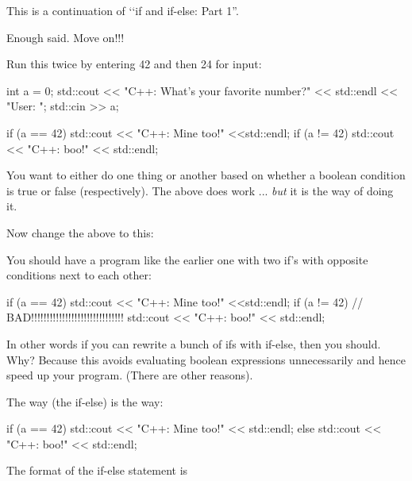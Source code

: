 \newpage{}

This is a continuation of \lq\lq if and if-else: Part 1''.

Enough said. Move on!!!

\newpage{}

Run this twice by entering 42 and then 24 for input:
\begin{console}
int a = 0;
std::cout << "C++: What's your favorite number?"
          << std::endl << "User: ";
std::cin >> a;

if (a == 42)
   std::cout << "C++: Mine too!" <<std::endl;
if (a != 42)
   std::cout << "C++: boo!" << std::endl;
\end{console}

You want to either do one thing or another based on whether a boolean
condition is true or false (respectively). The above does work ...
\textit{but} it is the  way of doing it.

Now change the above to this:

You should  have a program like the earlier one with two
if's with opposite conditions next to each other:
\begin{console}
if (a == 42)
   std::cout << "C++: Mine too!" <<std::endl;
if (a != 42)      // BAD!!!!!!!!!!!!!!!!!!!!!!!!!!!!!!
   std::cout << "C++: boo!" << std::endl;
\end{console}

In other words if you can rewrite a bunch of ifs with if-else, then you
should. Why? Because this avoids evaluating boolean expressions
unnecessarily and hence speed up your program. (There are other
reasons).

The  way (the if-else) is the  way:

\begin{console}
if (a == 42)
   std::cout << "C++: Mine too!" << std::endl;
else
   std::cout << "C++: boo!" << std::endl;
\end{console}

The format of the if-else statement is
\begin{center}
\\
\EMPHASIZE{\texttt{[stmt1]}}\\
\\
\EMPHASIZE{\texttt{[stmt2]}}\\
\end{center}


